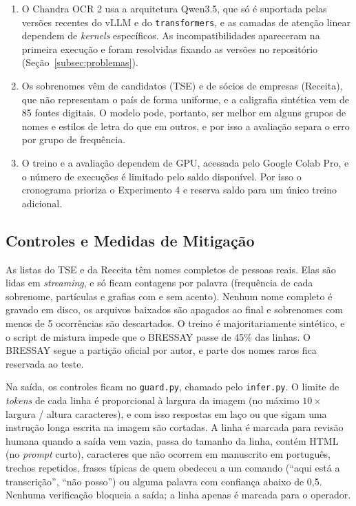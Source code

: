 \documentclass[12pt,a4paper]{article}
\begin{document}
\begin{enumerate}
    \item O Chandra OCR 2 usa a arquitetura Qwen3.5, que só é suportada pelas versões recentes do vLLM e do \texttt{transformers}, e as camadas de atenção linear dependem de \emph{kernels} específicos. As incompatibilidades apareceram na primeira execução e foram resolvidas fixando as versões no repositório (Seção~\ref{subsec:problemas}).
    \item Os sobrenomes vêm de candidatos (TSE) e de sócios de empresas (Receita), que não representam o país de forma uniforme, e a caligrafia sintética vem de 85 fontes digitais. O modelo pode, portanto, ser melhor em alguns grupos de nomes e estilos de letra do que em outros, e por isso a avaliação separa o erro por grupo de frequência.
    \item O treino e a avaliação dependem de GPU, acessada pelo Google Colab Pro, e o número de execuções é limitado pelo saldo disponível. Por isso o cronograma prioriza o Experimento 4 e reserva saldo para um único treino adicional.
\end{enumerate}

\subsection{Controles e Medidas de Mitigação}
\label{subsec:controles}

As listas do TSE e da Receita têm nomes completos de pessoas reais. Elas são lidas em \emph{streaming}, e só ficam contagens por palavra (frequência de cada sobrenome, partículas e grafias com e sem acento). Nenhum nome completo é gravado em disco, os arquivos baixados são apagados ao final e sobrenomes com menos de 5 ocorrências são descartados. O treino é majoritariamente sintético, e o script de mistura impede que o BRESSAY passe de 45\% das linhas. O BRESSAY segue a partição oficial por autor, e parte dos nomes raros fica reservada ao teste.

Na saída, os controles ficam no \texttt{guard.py}, chamado pelo \texttt{infer.py}. O limite de \emph{tokens} de cada linha é proporcional à largura da imagem (no máximo $10 \times$ largura / altura caracteres), e com isso respostas em laço ou que sigam uma instrução longa escrita na imagem são cortadas. A linha é marcada para revisão humana quando a saída vem vazia, passa do tamanho da linha, contém HTML (no \emph{prompt} curto), caracteres que não ocorrem em manuscrito em português, trechos repetidos, frases típicas de quem obedeceu a um comando (``aqui está a transcrição'', ``não posso'') ou alguma palavra com confiança abaixo de 0,5. Nenhuma verificação bloqueia a saída; a linha apenas é marcada para o operador.
\end{document}
